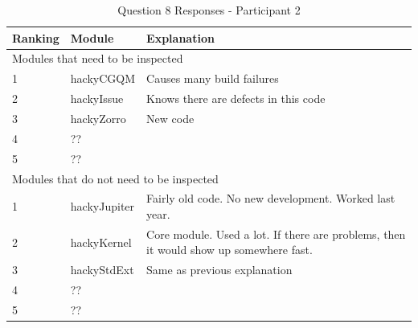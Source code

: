 \begin{table}[!h]
  \begin{center}
    \caption{Question 8 Responses - Participant 2}
    \label{tab:pre-selection-questionnaire-results-8-p2}
    \begin{tabular}{|p{2.0cm}|p{4.0cm}|p{7.0cm}|} \hline
{\bf Ranking} & {\bf Module} & {\bf Explanation} \\ \hline
\multicolumn{3}{|p{13.0cm}|}{Modules that need to be inspected} \\ \hline
1 & hackyCGQM & Causes many build failures \\ \hline
2 & hackyIssue & Knows there are defects in this code \\ \hline
3 & hackyZorro & New code \\ \hline
4 & ?? & \\ \hline
5 & ?? & \\ \hline
\multicolumn{3}{|p{13.0cm}|}{Modules that do not need to be inspected}  \\ \hline
1 & hackyJupiter & Fairly old code. No new development. Worked last year.\\ 
\hline
2 & hackyKernel & Core module. Used a lot. If there are problems, then it
would show up somewhere fast. \\ \hline
3 & hackyStdExt & Same as previous explanation \\ \hline
4 & ?? & \\ \hline
5 & ?? & \\ \hline
    \end{tabular}
  \end{center}
\end{table}


